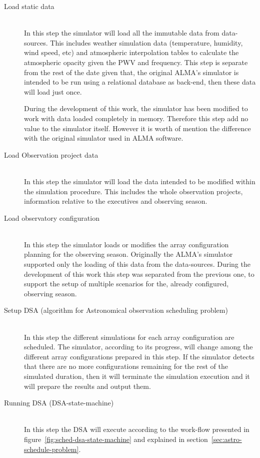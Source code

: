 \begin{description}
\item[Load static data] \hfill \\
In this step the simulator will load all the immutable data from data-sources. This includes weather simulation data (temperature, humidity, wind speed, etc) and atmospheric interpolation tables to calculate the atmospheric opacity given the PWV and frequency. This step is separate from the rest of the date given that, the original ALMA's simulator is intended to be run using a relational database as back-end, then these data will load just once.

During the development of this work, the simulator has been modified to work with data loaded completely in memory. Therefore this step add no value to the simulator itself. However it is worth of mention the difference with the original simulator used in ALMA software. 

\item[Load Observation project data] \hfill \\
In this step the simulator will load the data intended to be modified within the simulation procedure. This includes the whole observation projects, information relative to the executives and observing season.

\item[Load observatory configuration] \hfill \\
In this step the simulator loads or modifies the array configuration planning for the observing season. Originally the ALMA's simulator supported only the loading of this data from the data-sources. During the development of this work this step was separated from the previous one, to support the setup of multiple scenarios for the, already configured, observing season.

\item[Setup DSA (algorithm for Astronomical observation scheduling problem)] \hfill \\
In this step the different simulations for each array configuration are scheduled. The simulator, according to its progress, will change among the different array configurations prepared in this step. If the simulator detects that there are no more configurations remaining for the rest of the simulated duration, then it will terminate the simulation execution and it will prepare the results and output them.

\item[Running DSA (DSA-state-machine)] \hfill \\
In this step the DSA will execute according to the work-flow presented in figure~\ref{fig:sched-dsa-state-machine} and explained in section~\ref{sec:astro-schedule-problem}.


\end{description}
